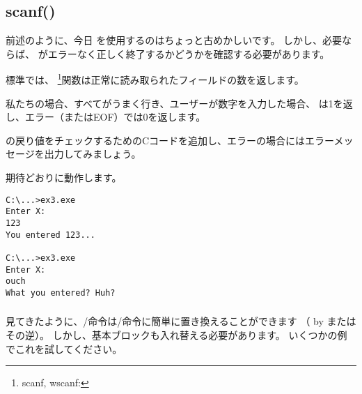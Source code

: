 \subsection{scanf()}

前述のように、今日 \scanf を使用するのはちょっと古めかしいです。 
しかし、必要ならば、 \scanf がエラーなく正しく終了するかどうかを確認する必要があります。



標準では、 \scanf \footnote{scanf, wscanf: \MSDNscanf}関数は正常に読み取られたフィールドの数を返します。

私たちの場合、すべてがうまく行き、ユーザーが数字を入力した場合、 \scanf は1を返し、エラー（または\ac{EOF}）では0を返します。

\scanf の戻り値をチェックするためのCコードを追加し、エラーの場合にはエラーメッセージを出力してみましょう。

期待どおりに動作します。

\begin{lstlisting}
C:\...>ex3.exe
Enter X:
123
You entered 123...

C:\...>ex3.exe
Enter X:
ouch
What you entered? Huh?
\end{lstlisting}






\subsubsection{\Exercise}

見てきたように、/命令は/命令に簡単に置き換えることができます
（ by またはその逆）。 
しかし、基本ブロックも入れ替える必要があります。 
いくつかの例でこれを試してください。
